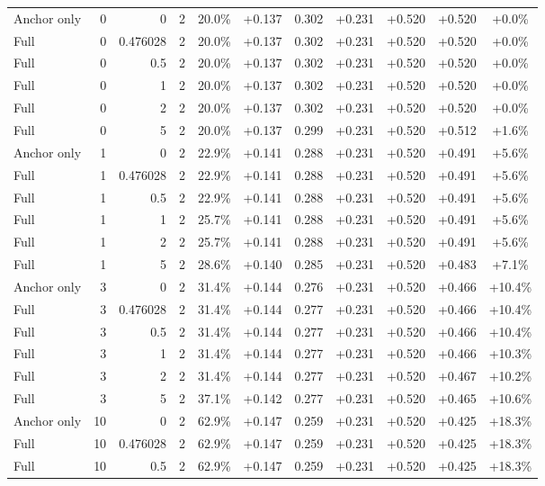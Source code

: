 \begin{table}[htbp]
\begin{tabular}{lrrrccccccc}
Anchor only & 0 & 0 & 2 & 20.0\% & +0.137 & 0.302 & +0.231 & +0.520 & +0.520 & +0.0\% \\
Full & 0 & 0.476028 & 2 & 20.0\% & +0.137 & 0.302 & +0.231 & +0.520 & +0.520 & +0.0\% \\
Full & 0 & 0.5 & 2 & 20.0\% & +0.137 & 0.302 & +0.231 & +0.520 & +0.520 & +0.0\% \\
Full & 0 & 1 & 2 & 20.0\% & +0.137 & 0.302 & +0.231 & +0.520 & +0.520 & +0.0\% \\
Full & 0 & 2 & 2 & 20.0\% & +0.137 & 0.302 & +0.231 & +0.520 & +0.520 & +0.0\% \\
Full & 0 & 5 & 2 & 20.0\% & +0.137 & 0.299 & +0.231 & +0.520 & +0.512 & +1.6\% \\
Anchor only & 1 & 0 & 2 & 22.9\% & +0.141 & 0.288 & +0.231 & +0.520 & +0.491 & +5.6\% \\
Full & 1 & 0.476028 & 2 & 22.9\% & +0.141 & 0.288 & +0.231 & +0.520 & +0.491 & +5.6\% \\
Full & 1 & 0.5 & 2 & 22.9\% & +0.141 & 0.288 & +0.231 & +0.520 & +0.491 & +5.6\% \\
Full & 1 & 1 & 2 & 25.7\% & +0.141 & 0.288 & +0.231 & +0.520 & +0.491 & +5.6\% \\
Full & 1 & 2 & 2 & 25.7\% & +0.141 & 0.288 & +0.231 & +0.520 & +0.491 & +5.6\% \\
Full & 1 & 5 & 2 & 28.6\% & +0.140 & 0.285 & +0.231 & +0.520 & +0.483 & +7.1\% \\
Anchor only & 3 & 0 & 2 & 31.4\% & +0.144 & 0.276 & +0.231 & +0.520 & +0.466 & +10.4\% \\
Full & 3 & 0.476028 & 2 & 31.4\% & +0.144 & 0.277 & +0.231 & +0.520 & +0.466 & +10.4\% \\
Full & 3 & 0.5 & 2 & 31.4\% & +0.144 & 0.277 & +0.231 & +0.520 & +0.466 & +10.4\% \\
Full & 3 & 1 & 2 & 31.4\% & +0.144 & 0.277 & +0.231 & +0.520 & +0.466 & +10.3\% \\
Full & 3 & 2 & 2 & 31.4\% & +0.144 & 0.277 & +0.231 & +0.520 & +0.467 & +10.2\% \\
Full & 3 & 5 & 2 & 37.1\% & +0.142 & 0.277 & +0.231 & +0.520 & +0.465 & +10.6\% \\
Anchor only & 10 & 0 & 2 & 62.9\% & +0.147 & 0.259 & +0.231 & +0.520 & +0.425 & +18.3\% \\
Full & 10 & 0.476028 & 2 & 62.9\% & +0.147 & 0.259 & +0.231 & +0.520 & +0.425 & +18.3\% \\
Full & 10 & 0.5 & 2 & 62.9\% & +0.147 & 0.259 & +0.231 & +0.520 & +0.425 & +18.3\% \\

\end{tabular}
\end{table}
